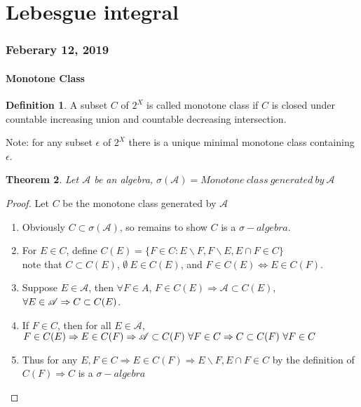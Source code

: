\documentclass{article}
\newtheorem{theorem}{Theorem}[section]
\theoremstyle{definition}
\newtheorem{definition}[theorem]{Definition}
\begin{document}
\part{Lebesgue integral}

\section{Feberary 12, 2019}

\subsection{Monotone Class}

\begin{definition}
	A subset $C$ of $2^X$ is called monotone class if $C$ is closed under countable increasing union and countable decreasing intersection.
\end{definition}

Note: for any subset $\epsilon$ of $2^X$ there is a unique minimal monotone class containing $\epsilon$.

\begin{theorem}
	Let $\mathscr{A}$ be an algebra, $\sigma(\mathscr{A})=Monotone \ class \ generated \ by \ \mathscr{A}$
\end{theorem}

\begin{proof}
	Let $C$ be the monotone class generated by $\mathscr{A}$
	\begin{enumerate}
		\item Obviously $C\subset \sigma(\mathscr{A})$, so remains to show $C$ is a $\sigma-algebra$.
		\item For $E\in C$, define $C(E)=\{F\in C: E\backslash F,F\backslash E, E\cap F\in C\}$ \\
		note that $C\subset C(E)$, $\emptyset \ E \in C(E)$, and $F\in C(E) \Leftrightarrow E\in C(F)$.
		\item  Suppose $E\in \mathscr{A}$, then $\forall F\in A$, $F\in C(E) \Rightarrow \mathscr{A}\subset C(E)$,$\forall E\in \mathscr{A} \\ \Rightarrow  C\subset C(E)$.
		\item If $F\in C$, then for all $E\in \mathscr{A}$, $F\in C(E) \Rightarrow E\in C(F) \\ \Rightarrow \mathscr{A} \subset C(F) \ \forall F\in C \Rightarrow C\subset C(F) \ \forall F\in C$
		\item Thus for any $E,F\in C \Rightarrow E\in C(F) \Rightarrow E\backslash F, E\cap F \in C$ by the definition of $C(F) \Rightarrow C$ is a $\sigma-algebra$\\
	\end{enumerate}
\end{proof}
\end{document}
